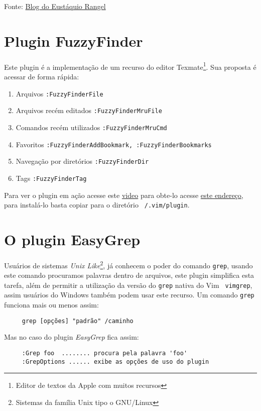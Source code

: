 Fonte: \href{http://eustaquiorangel.com/posts/522}{Blog do Eustáquio Rangel}

\section{Plugin FuzzyFinder}\label{sec:Plugin FuzzyFinder}                                       
Este plugin é a implementação de um recurso do editor 
Texmate\footnote{Editor de textos da Apple com muitos recursos}.
Sua proposta é acessar de forma rápida:

\begin{enumerate}
\item Arquivos \verb|:FuzzyFinderFile|
\item Arquivos recém editados \verb|:FuzzyFinderMruFile|
\item Comandos recém utilizados \verb|:FuzzyFinderMruCmd|
\item Favoritos \verb|:FuzzyFinderAddBookmark, :FuzzyFinderBookmarks|
\item Navegação por diretórios \verb|:FuzzyFinderDir|
\item Tags {\tt :FuzzyFinderTag}
\end{enumerate}

Para ver o plugin em ação acesse este
\href{http://vimeo.com/2938498}{video} para obte-lo acesse 
 \href{http://www.vim.org/scripts/script.php?script\_id=1984}{este endereço},
para instalá-lo basta copiar para o diretório 
{\tt ~/.vim/plugin}.

\section{O plugin EasyGrep}
\label{sec:O plugin EasyGrep}

Usuários de sistemas {\em Unix Like}\footnote{Sistemas da família Unix tipo o
GNU/Linux}, já conhecem o poder do comando {\tt grep}, usando este comando
procuramos palavras dentro de arquivos, este plugin simplifica esta tarefa,
além de permitir a utilização da versão do {\tt grep} nativa do Vim {\tt
vimgrep}, assim usuários do Windows também podem usar este recurso. Um comando
{\tt grep} funciona mais ou menos assim:

\begin{verbatim}
     grep [opções] "padrão" /caminho
\end{verbatim}

Mas no caso do plugin {\em EasyGrep} fica assim:

\begin{verbatim}
     :Grep foo  ........ procura pela palavra 'foo'
     :GrepOptions ...... exibe as opções de uso do plugin
\end{verbatim}

